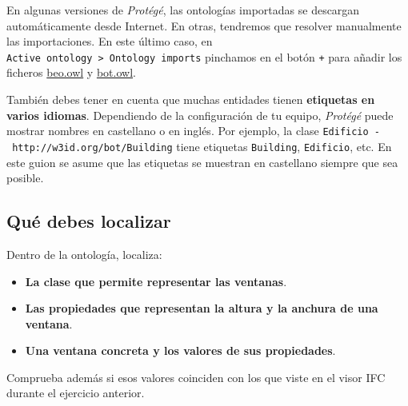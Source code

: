 \documentclass[
  spanish,
  11pt,
  a4paper,
  DIV=11,
  numbers=noendperiod]{scrartcl}
\providecommand{\tightlist}{\setlength{\itemsep}{0pt}\setlength{\parskip}{0pt}}
\begin{document}
\begin{tcolorbox}[enhanced jigsaw, leftrule=.75mm, breakable, colback=white, colbacktitle=quarto-callout-tip-color!10!white, bottomrule=.15mm, left=2mm, bottomtitle=1mm, coltitle=black, toprule=.15mm, toptitle=1mm, rightrule=.15mm, opacityback=0, title=\textcolor{quarto-callout-tip-color}{\faLightbulb}\hspace{0.5em}{Si faltan importaciones}, arc=.35mm, titlerule=0mm, colframe=quarto-callout-tip-color-frame, opacitybacktitle=0.6]

En algunas versiones de \emph{Protégé}, las ontologías importadas se
descargan automáticamente desde Internet. En otras, tendremos que
resolver manualmente las importaciones. En este último caso, en
\texttt{Active\ ontology\ \textgreater{}\ Ontology\ imports} pinchamos
en el botón \texttt{+} para añadir los ficheros
\href{../resources/practica8/files/beo.owl}{beo.owl} y
\href{../resources/practica8/files/bot.owl}{bot.owl}.

\end{tcolorbox}

También debes tener en cuenta que muchas entidades tienen
\textbf{etiquetas en varios idiomas}. Dependiendo de la configuración de
tu equipo, \emph{Protégé} puede mostrar nombres en castellano o en
inglés. Por ejemplo, la clase
\texttt{Edificio\ ‐\ http://w3id.org/bot/Building} tiene etiquetas
\texttt{Building}, \texttt{Edificio}, etc. En este guion se asume que
las etiquetas se muestran en castellano siempre que sea posible.


\subsection{Qué debes localizar}\label{quuxe9-debes-localizar}

Dentro de la ontología, localiza:

\begin{itemize}
\tightlist
\item
  \textbf{La clase que permite representar las ventanas}.
\item
  \textbf{Las propiedades que representan la altura y la anchura de una
  ventana}.
\item
  \textbf{Una ventana concreta y los valores de sus propiedades}.
\end{itemize}

Comprueba además si esos valores coinciden con los que viste en el visor
IFC durante el ejercicio anterior.
\end{document}
